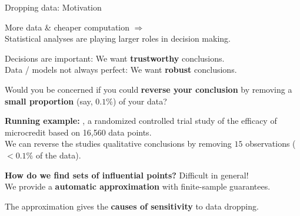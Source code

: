 \begin{frame}{Dropping data: Motivation}

More data \& cheaper computation $\Rightarrow$\\
Statistical analyses are
playing larger roles in decision making.

\vspace{1em}
Decisions are important: We want \textbf{trustworthy} conclusions.\\
Data / models not always perfect: We want \textbf{robust} conclusions.


\vspace{1em}
Would you be concerned if you could \textbf{reverse your conclusion} by removing
a \textbf{small proportion} (say, $0.1\%$) of your data?

\vspace{1em}
\textbf{Running example:} \citet{angelucci2015microcredit}, a
randomized controlled trial study of the efficacy of microcredit based
on 16,560 data points.  \\We can reverse the studies qualitative
conclusions by removing $15$ observations ($< 0.1 \%$ of the data).

\vspace{1em}
\textbf{How do we find sets of influential points?}  Difficult in general!\\

\vspace{1em}
We provide a \textbf{automatic approximation} with finite-sample
guarantees.

\vspace{1em}
The approximation gives the \textbf{causes of sensitivity} to data dropping.

\end{frame}


